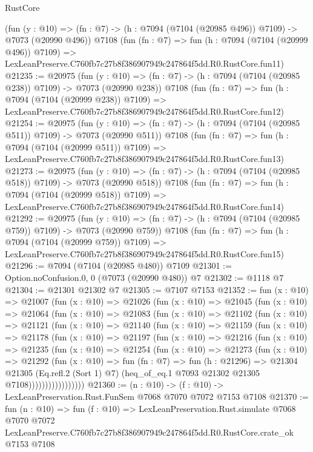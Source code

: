 \begin{lexlean}{RustCore}
\begin{coremodule}
    (fun (y : @10) => (fn : @7) -> (h : @7094 (@7104 (@20985 @496)) @7109) -> @7073 (@20990 @496))
    @7108
    (fun (fn : @7) =>
    fun (h : @7094 (@7104 (@20999 @496)) @7109) =>
    LexLeanPreserve.C760fb7c27b8f386907949c247864f5dd.R0.RustCore.fun11)
@21235 := @20975
    (fun (y : @10) => (fn : @7) -> (h : @7094 (@7104 (@20985 @238)) @7109) -> @7073 (@20990 @238))
    @7108
    (fun (fn : @7) =>
    fun (h : @7094 (@7104 (@20999 @238)) @7109) =>
    LexLeanPreserve.C760fb7c27b8f386907949c247864f5dd.R0.RustCore.fun12)
@21254 := @20975
    (fun (y : @10) => (fn : @7) -> (h : @7094 (@7104 (@20985 @511)) @7109) -> @7073 (@20990 @511))
    @7108
    (fun (fn : @7) =>
    fun (h : @7094 (@7104 (@20999 @511)) @7109) =>
    LexLeanPreserve.C760fb7c27b8f386907949c247864f5dd.R0.RustCore.fun13)
@21273 := @20975
    (fun (y : @10) => (fn : @7) -> (h : @7094 (@7104 (@20985 @518)) @7109) -> @7073 (@20990 @518))
    @7108
    (fun (fn : @7) =>
    fun (h : @7094 (@7104 (@20999 @518)) @7109) =>
    LexLeanPreserve.C760fb7c27b8f386907949c247864f5dd.R0.RustCore.fun14)
@21292 := @20975
    (fun (y : @10) => (fn : @7) -> (h : @7094 (@7104 (@20985 @759)) @7109) -> @7073 (@20990 @759))
    @7108
    (fun (fn : @7) =>
    fun (h : @7094 (@7104 (@20999 @759)) @7109) =>
    LexLeanPreserve.C760fb7c27b8f386907949c247864f5dd.R0.RustCore.fun15)
@21296 := @7094 (@7104 (@20985 @480)) @7109
@21301 := Option.noConfusion.{0, 0} (@7073 (@20990 @480)) @7
@21302 := @1118 @7
@21304 := @21301 @21302 @7
@21305 := @7107 @7153
@21352 := fun (x : @10) =>
  @21007
    (fun (x : @10) =>
    @21026
      (fun (x : @10) =>
      @21045
        (fun (x : @10) =>
        @21064
          (fun (x : @10) =>
          @21083
            (fun (x : @10) =>
            @21102
              (fun (x : @10) =>
              @21121
                (fun (x : @10) =>
                @21140
                  (fun (x : @10) =>
                  @21159
                    (fun (x : @10) =>
                    @21178
                      (fun (x : @10) =>
                      @21197
                        (fun (x : @10) =>
                        @21216
                          (fun (x : @10) =>
                          @21235
                            (fun (x : @10) =>
                            @21254
                              (fun (x : @10) =>
                              @21273
                                (fun (x : @10) =>
                                @21292
                                  (fun (x : @10) =>
                                  fun (fn : @7) =>
                                  fun (h : @21296) =>
                                  @21304
                                    @21305
                                    (Eq.refl.{2} (Sort 1) @7)
                                    (heq_of_eq.{1} @7093 @21302 @21305 @7108)))))))))))))))))
@21360 := (n : @10) -> (f : @10) -> LexLeanPreservation.Rust.FunSem @7068 @7070 @7072 @7153 @7108
@21370 := fun (n : @10) =>
  fun (f : @10) =>
  LexLeanPreservation.Rust.simulate
    @7068
    @7070
    @7072
    LexLeanPreserve.C760fb7c27b8f386907949c247864f5dd.R0.RustCore.crate_ok
    @7153
    @7108
\end{coremodule}
\end{lexlean}
